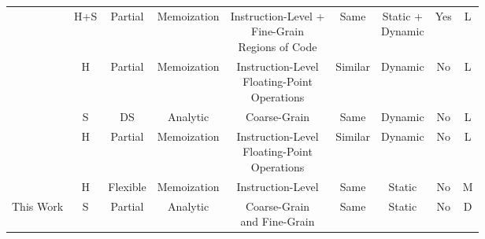 \begin{adjustbox}{angle=0}
\begin{scriptsize}
\begin{tabular}{ccccccccc}
\cite{reuse10}       & H+S & Partial        & Memoization         & \makecell{Instruction-Level + \\ Fine-Grain \\ Regions of Code} & Same       & \makecell{Static + \\ Dynamic}          & Yes     & L  \\
\cite{reuse11}       & H            & Partial & Memoization         & \makecell{Instruction-Level \\ Floating-Point \\ Operations}     & Similar             & Dynamic          & No             & L   \\
\cite{reuse12}       & S            & DS                    & Analytic            & Coarse-Grain                          & Same       & Dynamic          & No             & L         \\
\cite{reuse13}       & H            & Partial       & Memoization         & \makecell{Instruction-Level \\ Floating-Point \\ Operations}     & Similar             & Dynamic          & No             & L                 \\
\cite{reuse14}       & H            & Flexible                   & Memoization         & Instruction-Level                                & Same       & Static          & No             & M  \\
\midrule

This Work       & S            & Partial                & Analytic            & \makecell{Coarse-Grain \\ and Fine-Grain}        & Same       & Static           & No             & D \\

\bottomrule

\end{tabular}
\end{scriptsize}
\end{adjustbox}